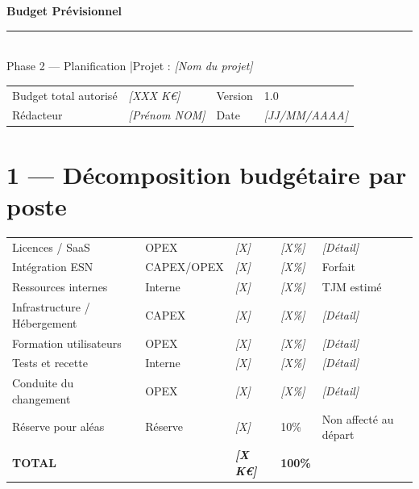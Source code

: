 \documentclass[11pt,a4paper,oneside]{report}
\begin{document}
\small

\begin{center}
{\LARGE\bfseries\color{cnNavy} Budget Prévisionnel}\\[4pt]
\textcolor{cnOrange}{\rule{10cm}{1pt}}\\[4pt]
{\large\color{cnSlate} Phase 2 — Planification \quad|\quad Projet : \textit{[Nom du projet]}}
\end{center}

\vspace{6pt}
\renewcommand{\arraystretch}{1.4}
\begin{tabularx}{\textwidth}{L{3.5cm} Y L{3.5cm} Y}
\toprule
{} &  &  &  \\
\midrule
Budget total autorisé & \textit{[XXX K€]} & Version   & 1.0 \\
Rédacteur             & \textit{[Prénom NOM]} & Date  & \textit{[JJ/MM/AAAA]} \\
\bottomrule
\end{tabularx}

\section*{1 — Décomposition budgétaire par poste}

\renewcommand{\arraystretch}{1.4}
\begin{tabularx}{\textwidth}{L{5cm} C{2.5cm} C{2.5cm} C{2.5cm} Y}
\toprule
{} &  &  &  &  \\
\midrule
Licences / SaaS        & OPEX & \textit{[X]} & \textit{[X\%]} & \textit{[Détail]} \\
Intégration ESN        & CAPEX/OPEX & \textit{[X]} & \textit{[X\%]} & Forfait \\
Ressources internes    & Interne & \textit{[X]} & \textit{[X\%]} & TJM estimé \\
Infrastructure / Hébergement & CAPEX & \textit{[X]} & \textit{[X\%]} & \textit{[Détail]} \\
Formation utilisateurs & OPEX & \textit{[X]} & \textit{[X\%]} & \textit{[Détail]} \\
Tests et recette       & Interne & \textit{[X]} & \textit{[X\%]} & \textit{[Détail]} \\
Conduite du changement & OPEX & \textit{[X]} & \textit{[X\%]} & \textit{[Détail]} \\
Réserve pour aléas     & Réserve & \textit{[X]} & 10\% & Non affecté au départ \\
\midrule
{}\textbf{TOTAL} & & \textbf{\textit{[X K€]}} & \textbf{100\%} & \\
\bottomrule
\end{tabularx}
\end{document}
